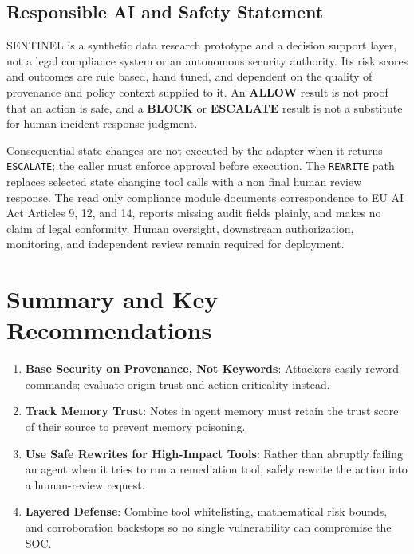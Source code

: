 \documentclass[11pt,a4paper]{article}
\begin{document}
\subsection{Responsible AI and Safety Statement}
SENTINEL is a synthetic data research prototype and a decision support layer, not a
legal compliance system or an autonomous security authority. Its risk scores and
outcomes are rule based, hand tuned, and dependent on the quality of provenance and
policy context supplied to it. An \textbf{ALLOW} result is not proof that an action
is safe, and a \textbf{BLOCK} or \textbf{ESCALATE} result is not a substitute for
human incident response judgment.

Consequential state changes are not executed by the adapter when it returns
\texttt{ESCALATE}; the caller must enforce approval before execution. The
\texttt{REWRITE} path replaces selected state changing tool calls with a non final
human review response. The read only compliance module documents correspondence to
EU AI Act Articles 9, 12, and 14, reports missing audit fields plainly, and makes no
claim of legal conformity. Human oversight, downstream authorization, monitoring,
and independent review remain required for deployment.

\section{Summary and Key Recommendations}
\begin{enumerate}[leftmargin=1.5em]
    \item \textbf{Base Security on Provenance, Not Keywords}: Attackers easily reword commands; evaluate origin trust and action criticality instead.
    \item \textbf{Track Memory Trust}: Notes in agent memory must retain the trust score of their source to prevent memory poisoning.
    \item \textbf{Use Safe Rewrites for High-Impact Tools}: Rather than abruptly failing an agent when it tries to run a remediation tool, safely rewrite the action into a human-review request.
    \item \textbf{Layered Defense}: Combine tool whitelisting, mathematical risk bounds, and corroboration backstops so no single vulnerability can compromise the SOC.
\end{enumerate}
\end{document}
